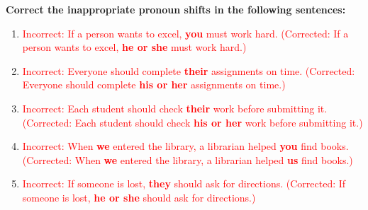 \documentclass[12pt]{article}
\begin{document}
\begin{tcolorbox}[colframe=black!60, colback=white, 
coltitle=black, colbacktitle=black!15, fonttitle=\bfseries\Large, 
title=Guided Practice, halign title=center, left=10pt, right=10pt, top=10pt, bottom=15pt]
\textbf{Correct the inappropriate pronoun shifts in the following sentences:}
\begin{enumerate}[itemsep=3em]
    \item \textcolor{red}{Incorrect: If a person wants to excel, \textbf{you} must work hard. (Corrected: If a person wants to excel, \textbf{he or she} must work hard.)}
    \item \textcolor{red}{Incorrect: Everyone should complete \textbf{their} assignments on time. (Corrected: Everyone should complete \textbf{his or her} assignments on time.)}
    \item \textcolor{red}{Incorrect: Each student should check \textbf{their} work before submitting it. (Corrected: Each student should check \textbf{his or her} work before submitting it.)}
    \item \textcolor{red}{Incorrect: When \textbf{we} entered the library, a librarian helped \textbf{you} find books. (Corrected: When \textbf{we} entered the library, a librarian helped \textbf{us} find books.)}
    \item \textcolor{red}{Incorrect: If someone is lost, \textbf{they} should ask for directions. (Corrected: If someone is lost, \textbf{he or she} should ask for directions.)}
\end{enumerate}
\end{tcolorbox}

\vspace{1em}
\end{document}
